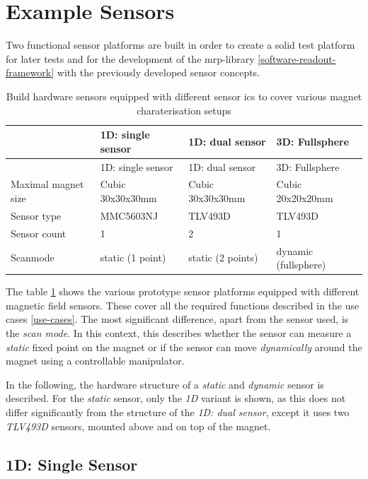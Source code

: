 \hypertarget{example-sensors}{%
\section{Example Sensors}\label{example-sensors}}

Two functional sensor platforms are built in order to create a solid
test platform for later tests and for the development of the
\gls{mrp}-library \ref{software-readout-framework} with the previously
developed sensor concepts.

\begin{longtable}[]{@{}llll@{}}
\caption{Build hardware sensors equipped with different sensor \gls{ic}s
to cover various magnet charaterisation setups
\label{Build_hardware_sensors_equipped_with_different_sensor_(+ic)s_to_cover_various_magnet_charaterisation_setups.csv}}\tabularnewline
\toprule
& 1D: single sensor & 1D: dual sensor & 3D: Fullsphere\tabularnewline
\midrule
\endfirsthead
\toprule
& 1D: single sensor & 1D: dual sensor & 3D: Fullsphere\tabularnewline
\midrule
\endhead
Maximal magnet size & Cubic 30x30x30mm & Cubic 30x30x30mm & Cubic
20x20x20mm\tabularnewline
Sensor type & MMC5603NJ & TLV493D & TLV493D\tabularnewline
Sensor count & 1 & 2 & 1\tabularnewline
Scanmode & static (1 point) & static (2 points) & dynamic
(fullsphere)\tabularnewline
\bottomrule
\end{longtable}

The table
\ref{Build_hardware_sensors_equipped_with_different_sensor_(+ic)s_to_cover_various_magnet_charaterisation_setups.csv}
shows the various prototype sensor platforms equipped with different
magnetic field sensors. These cover all the required functions described
in the use cases \ref{use-cases}. The most significant difference, apart
from the sensor used, is the \emph{scan mode}. In this context, this
describes whether the sensor can measure a \emph{static} fixed point on
the magnet or if the sensor can move \emph{dynamically} around the
magnet using a controllable manipulator.

In the following, the hardware structure of a \emph{static} and
\emph{dynamic} sensor is described. For the \emph{static} sensor, only
the \emph{1D} variant is shown, as this does not differ significantly
from the structure of the \emph{1D: dual sensor}, except it uses two
\emph{TLV493D} sensors, mounted above and on top of the magnet.

\hypertarget{d-single-sensor}{%
\subsection{1D: Single Sensor}\label{d-single-sensor}}


